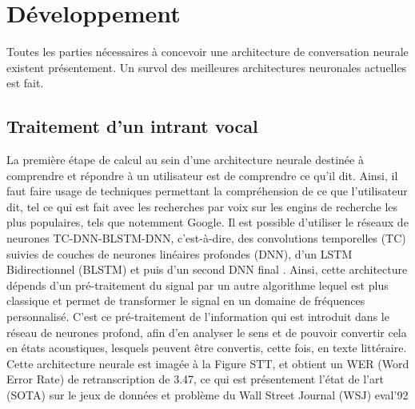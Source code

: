 \documentclass[11pt]{article}
\begin{document}
\section{Développement}
Toutes les parties nécessaires à concevoir une architecture de conversation neurale existent présentement. Un survol des meilleures architectures neuronales actuelles est fait.

\subsection{Traitement d'un intrant vocal}
La première étape de calcul au sein d’une architecture neurale destinée à comprendre et répondre à un utilisateur est de comprendre ce qu’il dit. Ainsi, il faut faire usage de techniques permettant la compréhension de ce que l’utilisateur dit, tel ce qui est fait avec les recherches par voix sur les engins de recherche les plus populaires, tels que notemment Google. Il est possible d’utiliser le réseaux de neurones TC-DNN-BLSTM-DNN, c’est-à-dire, des convolutions temporelles (TC) suivies de couches de neurones linéaires profondes (DNN), d’un LSTM Bidirectionnel (BLSTM) et puis d’un second DNN final \cite{acousticModeling}. Ainsi, cette architecture dépends d’un pré-traitement du signal par un autre algorithme lequel est plus classique et permet de transformer le signal en un domaine de fréquences personnalisé. C’est ce pré-traitement de l’information qui est introduit dans le réseau de neurones profond, afin d’en analyser le sens et de pouvoir convertir cela en états acoustiques, lesquels peuvent être convertis, cette fois, en texte littéraire. Cette architecture neurale est imagée à la Figure STT, et obtient un WER (Word Error Rate) de retranscription de 3.47, ce qui est présentement l’état de l’art (SOTA) sur le jeux de données et problème du Wall Street Journal (WSJ) eval’92 %

\end{document}
